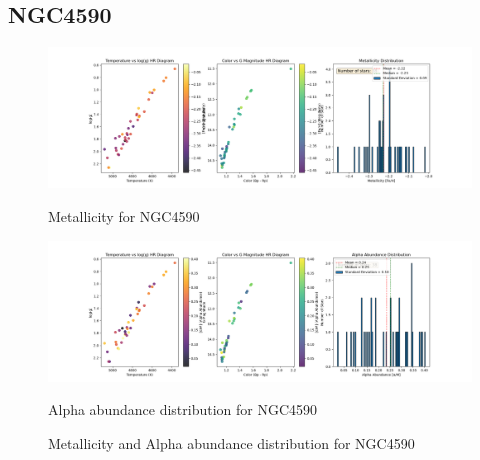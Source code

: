 \documentclass[a4paper,12pt]{article}
\begin{document}
\subsection{NGC4590}
\begin{figure}[H]
    \centering
    \begin{minipage}[b]{0.8\textwidth}
        \centering
        \includegraphics[width=\textwidth]{NGC4590_metalicity.png}
        \caption{Metallicity for NGC4590}
        \label{fig:NGC4590_metalicity}
    \end{minipage}
    \hfill
    \begin{minipage}[b]{0.8\textwidth}
        \centering
        \includegraphics[width=\textwidth]{NGC4590_alpha.png}
        \caption{Alpha abundance distribution for NGC4590}
        \label{fig:NGC4590_alpha}
    \end{minipage}
    \caption{Metallicity and Alpha abundance distribution for NGC4590}
    \label{fig:NGC4590_combined}
\end{figure}
\clearpage
\end{document}
